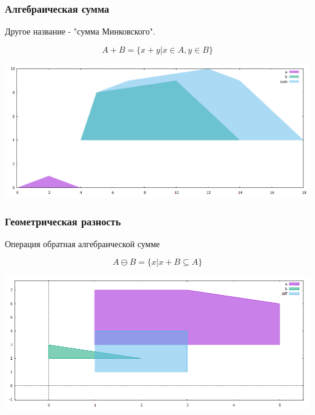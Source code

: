 \documentclass{beamer}
\begin{document}
  
  \begin{frame}
    \frametitle{Алгебраическая сумма}
    
    Другое название - "сумма Минковского". 
    
    \begin{equation}
      A + B =  \{ x + y | x \in A, y \in B \} 
    \end{equation}

    \includegraphics[width=1.0\textwidth]{minkowski_sum}
  
  \end{frame}
  
  
  \begin{frame}
    \frametitle{Геометрическая разность}
    
    Операция обратная алгебраической сумме

    \begin{equation}
      A \ominus B =  \{ x | x + B \subseteq A \} 
    \end{equation}

    \includegraphics[width=1.0\textwidth]{geom_diff}

  \end{frame}
  
\end{document}
